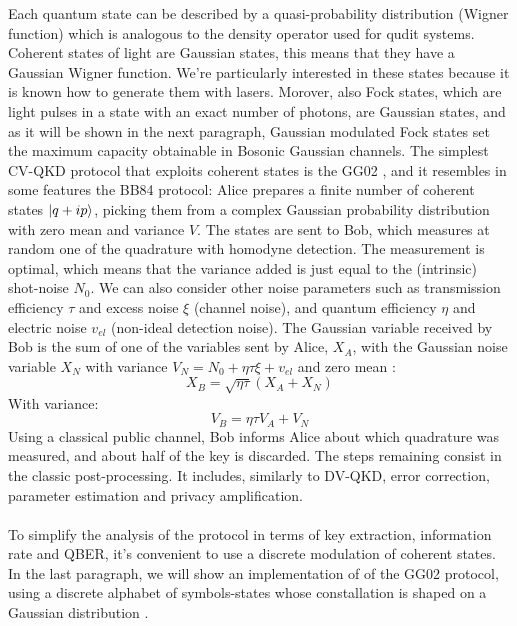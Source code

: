 \documentclass[journal, letterpaper]{IEEEtran}
\begin{document}
Each quantum state can be described by a quasi-probability distribution (Wigner function) which is analogous to the density operator used for qudit systems. Coherent states of light are Gaussian states, this means that they have a Gaussian Wigner function. 
We're particularly interested in these states because it is known how to generate them with lasers. Morover, also Fock states, which are light pulses in a state with an exact number of photons, are Gaussian states, and as it will be shown in the next paragraph, Gaussian modulated Fock states set the maximum capacity obtainable in Bosonic Gaussian channels. 
The simplest CV-QKD protocol that exploits coherent states is the GG02 \cite{grosshans}, and it resembles in some features the BB84 protocol: Alice prepares a finite number of coherent states $\ket{q + ip}$, picking them from a complex Gaussian probability distribution with zero mean and variance $V$. The states are sent to Bob, which measures at random one of the quadrature with homodyne detection. The measurement is optimal, which means that the variance added is just equal to the (intrinsic) shot-noise $N_0$. We can also consider other noise parameters  such as transmission efficiency $\tau$ and excess noise $\xi$ (channel noise), and quantum efficiency $\eta$ and electric noise $v_{el}$ (non-ideal detection noise). The Gaussian variable received by Bob is the sum of one of the variables sent by Alice, $X_{A}$, with the Gaussian noise variable $X_{N}$ with variance $V_{N} = N_0 + \eta\tau\xi+ v_{el}$ and zero mean \cite{jouguet}:
\[X_{B} = \sqrt{\eta\tau}(X_{A}+X_{N})\]
With variance: 
 \[V_{B} =\eta\tau V_{A} + V_{N}\]
Using a classical public channel, Bob informs Alice about which quadrature was measured, and about half of the key is discarded. 
The steps remaining consist in the classic post-processing. It includes, similarly to DV-QKD, error correction, parameter estimation and privacy amplification. 
\\
\\
To simplify the analysis of the protocol in terms of key extraction, information rate and QBER, it's convenient to use a discrete modulation of coherent states. In the last paragraph, we will show an implementation of of the GG02 protocol, using a discrete alphabet of symbols-states whose constallation is shaped on a Gaussian distribution \cite{Roumenstan}.
\end{document}
